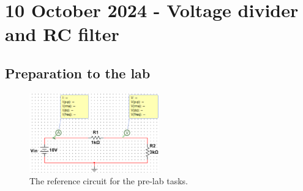 \section{10 October 2024 - Voltage divider and RC filter}

\subsection{Preparation to the lab}

\begin{figure}[htbp]
	\centering
	\includegraphics[width=0.5\textwidth]{../labs/2024-10-08-13-10-39.png}
	\caption{The reference circuit for the pre-lab tasks.}
	\label{fig:lab_02_prelabreference}
\end{figure}